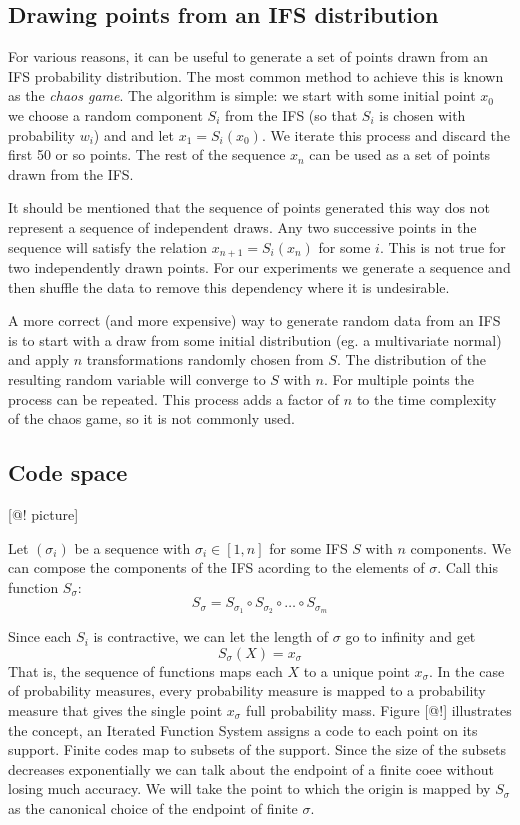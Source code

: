 \documentclass[11pt]{article}
\theoremstyle{definition}
\begin{document}
\subsection{Drawing points from an IFS distribution}

For various reasons, it can be useful to generate a set of points drawn from an IFS probability distribution. The most common method to achieve this is known as the \emph{chaos game}. The algorithm is simple: we start with some initial point $x_0$ we choose a random component $S_i$ from the IFS (so that $S_i$ is chosen with probability $w_i$) and and let $x_1 = S_i(x_0)$. We iterate this process and discard the first 50 or so points. The rest of the sequence $x_n$ can be used as a set of points drawn from the IFS.

It should be mentioned that the sequence of points generated this way dos not represent a sequence of independent draws. Any two successive points in the sequence will satisfy the relation $x_{n+1} = S_i(x_{n})$ for some $i$. This is not true for two independently drawn points. For our experiments we generate a sequence and then shuffle the data to remove this dependency where it is undesirable.

A more correct (and more expensive) way to generate random data from an IFS is to start with a draw from some initial distribution (eg. a multivariate normal) and apply $n$ transformations randomly chosen from $S$. The distribution of the resulting random variable will converge to $S$ with $n$. For multiple points the process can be repeated. This process adds a factor of $n$ to the time complexity of the chaos game, so it is not commonly used. 

\subsection{Code space}

[@! picture]

Let $(\sigma_i)$ be a sequence with $\sigma_i \in [1, n]$ for some IFS $S$ with $n$ components. We can compose the components of the IFS acording to the elements of $\sigma$. Call this function $S_\sigma$:
\[
S_\sigma = S_{\sigma_1} \circ S_{\sigma_2} \circ \ldots \circ S_{\sigma_m}
\]

Since each $S_i$ is contractive, we can let the length of $\sigma$ go to infinity and get 
\[
S_\sigma(X) = x_\sigma  
\] 
That is, the sequence of functions maps each $X$ to a unique point $x_\sigma$. In the case of probability measures, every probability measure is mapped to a probability measure that gives the single point $x_\sigma$ full probability mass. Figure [@!] illustrates the concept, an Iterated Function System assigns a code to each point on its support. Finite codes map to subsets of the support. Since the size of the subsets decreases exponentially we can talk about the endpoint of a finite coee without losing much accuracy. We will take the point to which the origin is mapped by $S_\sigma$ as the canonical choice of the endpoint of finite $\sigma$.
\end{document}
